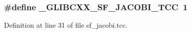 \subsubsection[{\+\_\+\+G\+L\+I\+B\+C\+X\+X\+\_\+\+S\+F\+\_\+\+J\+A\+C\+O\+B\+I\+\_\+\+T\+C\+C}]{\setlength{\rightskip}{0pt plus 5cm}\#define \+\_\+\+G\+L\+I\+B\+C\+X\+X\+\_\+\+S\+F\+\_\+\+J\+A\+C\+O\+B\+I\+\_\+\+T\+C\+C~1}\label{sf__jacobi_8tcc_a5aaa350a13d7d5da211f2b2bbdd648bb}


Definition at line 31 of file sf\+\_\+jacobi.\+tcc.

